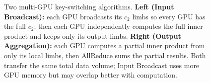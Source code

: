 \documentclass[11pt,letterpaper]{article}
\begin{document}
\begin{figure}[h]
\caption{Two multi-GPU key-switching algorithms. \textbf{Left (Input Broadcast):} each GPU
broadcasts its $c_2$ limbs so every GPU has the full $c_2$; then each GPU independently
computes the full inner product and keeps only its output limbs. \textbf{Right (Output
Aggregation):} each GPU computes a partial inner product from only its local limbs, then
AllReduce sums the partial results. Both transfer the same total data volume; Input Broadcast
uses more GPU memory but may overlap better with computation.}
\label{fig:keyswitch}
\end{figure}

\end{document}
